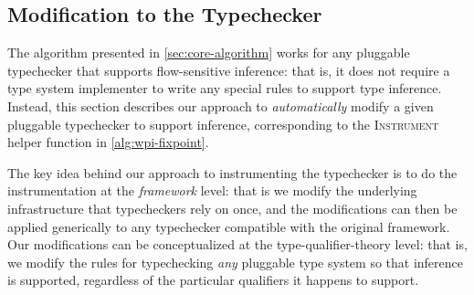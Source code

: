 \subsection{Modification to the Typechecker}
\label{sec:instrument}

The algorithm presented in \cref{sec:core-algorithm} works for
any pluggable typechecker that supports flow-sensitive inference:
that is, it does not require a type system implementer to write
any special rules to support type inference. Instead, this section
describes our approach to \emph{automatically} modify a given
pluggable typechecker to support inference, corresponding to the
\textsc{Instrument} helper function in \cref{alg:wpi-fixpoint}.

The key idea behind our approach to instrumenting the typechecker
is to do the instrumentation at the \emph{framework} level: that is
we modify the underlying infrastructure that typecheckers rely on
once, and the modifications can then be applied generically to any
typechecker compatible with the original framework. Our modifications
can be conceptualized at the type-qualifier-theory level: that is,
we modify the rules for typechecking \emph{any} pluggable type system
so that inference is supported,
regardless of the particular qualifiers it happens to support.


